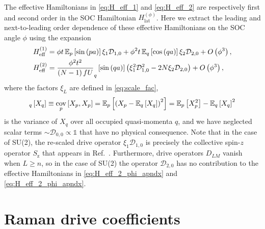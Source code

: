 \documentclass[nofootinbib,notitlepage,11pt]{revtex4-2}
\renewcommand{\t}{\text} %
\newcommand{\f}[2]{\dfrac{#1}{#2}} %
\newcommand{\p}[1]{\left(#1\right)} %
\renewcommand{\sp}[1]{\left[#1\right]} %
\newcommand{\1}{\mathds{1}}
\newcommand{\z}{\text{z}}
\newcommand{\D}{\mathcal{D}}
\newcommand{\EE}{\mathbb{E}}
\DeclareMathOperator{\cov}{cov}
\let\var\relax
\DeclareMathOperator{\var}{var}
\begin{document}
The effective Hamiltonians in \eqref{eq:H_eff_1} and
\eqref{eq:H_eff_2} are respectively first and second order in the SOC
Hamiltonian $H_{\t{lat}}^{(\phi)}$.  Here we extract the leading and
next-to-leading order dependence of these effective Hamiltonians on
the SOC angle $\phi$ using the expansion
\begin{align}
  H_{\t{eff}}^{(1)}
  &= \phi t \, \EE_p\sp{\sin\p{pa}} \xi_1 \D_{1,0}
  + \phi^2 t \, \EE_q\sp{\cos\p{qa}} \xi_2 \D_{2,0}
  + O\p{\phi^3},
  \label{eq:H_eff_1_phi_apndx} \\
  H_{\t{eff}}^{(2)}
  &= \f{\phi^2 t^2}{\p{N-1}fU} \var_q\sp{\sin\p{qa}}
  \p{\xi_1^2 \D_{1,0}^2 - 2 N \xi_2 \D_{2,0}}
  + O\p{\phi^3},
  \label{eq:H_eff_2_phi_apndx}
\end{align}
where the factors $\xi_L$ are defined in \eqref{eq:scale_fac},
\begin{align}
  \var_q\sp{X_q} \equiv \cov_p\sp{X_p,X_p}
  = \EE_p\sp{\p{X_p-\EE_q\sp{X_q}}^2}
  = \EE_p\sp{X_p^2} - \EE_q\sp{X_q}^2
\end{align}
is the variance of $X_q$ over all occupied quasi-momenta $q$, and we
have neglected scalar terms $\sim\D_{0,0}\propto\1$ that have no
physical consequence.  Note that in the case of SU(2), the re-scaled
drive operator $\xi_1\D_{1,0}$ is precisely the collective spin-$z$
operator $S_\z$ that appears in Ref.~\cite{he2019engineering}.
Furthermore, drive operators $D_{LM}$ vanish when $L\ge n$, so in the
case of SU(2) the operator $\D_{2,0}$ has no contribution to the
effective Hamiltonians in \eqref{eq:H_eff_2_phi_apndx} and
\eqref{eq:H_eff_2_phi_apndx}.

\section{Raman drive coefficients}
\label{sec:drive_raman_coeff}
\end{document}
